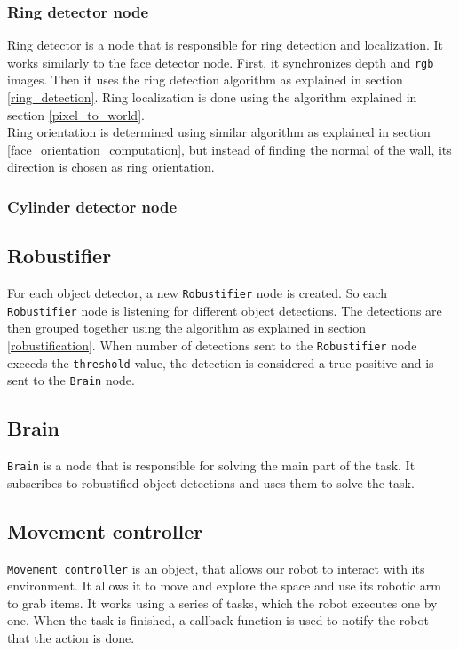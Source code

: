 \documentclass[12pt,a4paper]{article}
\begin{document}
	\subsubsection{Ring detector node}
	Ring detector is a node that is responsible for ring detection and localization. It works similarly to the face detector node. First, it synchronizes depth and \texttt{rgb} images. Then it uses the ring detection algorithm as explained in section \ref{ring_detection}. Ring localization is done using the algorithm explained in section \ref{pixel_to_world}. \\
	
	Ring orientation is determined using similar algorithm as explained in section \ref{face_orientation_computation}, but instead of finding the normal of the wall, its direction is chosen as ring orientation. \\ %
	
	\subsubsection{Cylinder detector node}

	\subsection{Robustifier}
	For each object detector, a new \texttt{Robustifier} node is created. So each \texttt{Robustifier} node is listening for different object detections. The detections are then grouped together using the algorithm as explained in section \ref{robustification}. When number of detections sent to the \texttt{Robustifier} node exceeds the \texttt{threshold} value, the detection is considered a true positive and is sent to the \texttt{Brain} node. \\
	
	\subsection{Brain}
	\texttt{Brain} is a node that is responsible for solving the main part of the task. It subscribes to robustified object detections and uses them to solve the task. \\
	
	
	\subsection{Movement controller}
	\texttt{Movement controller} is an object, that allows our robot to interact with its environment. It allows it to move and explore the space and use its robotic arm to grab items. It works using a series of tasks, which the robot executes one by one. When the task is finished, a callback function is used to notify the robot that the action is done. \\
\end{document}
